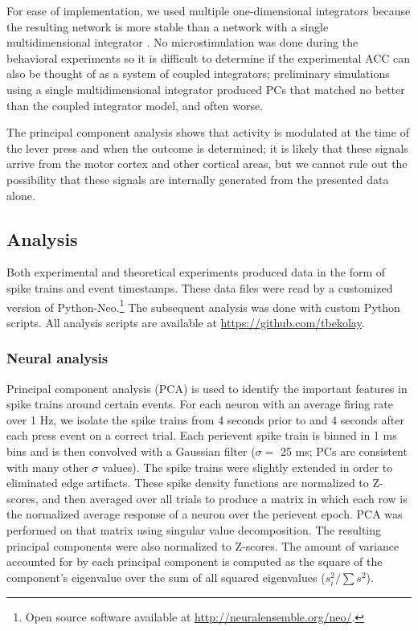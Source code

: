 \documentclass[11pt]{article}
\begin{document}
For ease of implementation,
we used multiple one-dimensional integrators
because the resulting network is more stable than
a network with a single multidimensional integrator
\citep{Singh2006}.
No microstimulation was done
during the behavioral experiments
so it is difficult to determine
if the experimental ACC
can also be thought of as
a system of coupled integrators;
preliminary simulations using
a single multidimensional integrator
produced PCs that matched no better
than the coupled integrator model,
and often worse.

The principal component analysis
shows that activity is modulated
at the time of the lever press
and when the outcome is determined;
it is likely that these signals
arrive from the motor cortex
and other cortical areas,
but we cannot rule out the possibility
that these signals are internally generated
from the presented data alone.

\subsection{Analysis}

Both experimental and theoretical experiments
produced data in the form of spike trains
and event timestamps.
These data files were read
by a customized version of Python-Neo.\footnote{Open source software
  available at \url{http://neuralensemble.org/neo/}.}
The subsequent analysis was done
with custom Python scripts.
All analysis scripts are available
at \url{https://github.com/tbekolay}.

\subsubsection{Neural analysis}

Principal component analysis (PCA)
is used to identify the important features
in spike trains around certain events.
For each neuron with an average firing rate over 1 Hz,
we isolate the spike trains from 4 seconds prior to and
4 seconds after each press event on a correct trial.
Each perievent spike train is binned in 1 ms bins and is then
convolved with a Gaussian filter ($\sigma = $ 25 ms;
PCs are consistent with many other $\sigma$ values).
The spike trains were slightly extended
in order to eliminated edge artifacts.
These spike density functions
are normalized to Z-scores,
and then averaged over all trials to
produce a matrix in which each row is
the normalized average response of a neuron
over the perievent epoch.
PCA was performed on that matrix
using singular value decomposition.
The resulting principal components
were also normalized to Z-scores.
The amount of variance accounted for
by each principal component
is computed as the square of the component's eigenvalue
over the sum of all squared eigenvalues
($s_i^2 / \sum s^2$).
\end{document}
